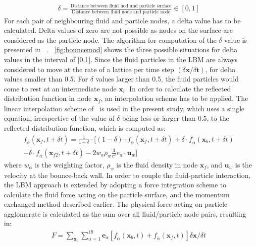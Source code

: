 \begin{align}
\delta = \frac{\mbox{Distance between fluid nod and particle surface}}{\mbox{Distance between fluid node and particle node}} \in [0,1]
\end{align} 
For each pair of neighbouring fluid and particle nodes, a delta value has to be calculated. Delta values of zero are not possible as nodes on the surface are considered as the particle node. The algorithm for computation of the $\delta$ value is presented in ~\citet{Iglberger2008}. ~\cref{fig:bouncemod} shows the three possible situations for delta values in the interval of [0,1]. Since the fluid particles in the LBM are always considered to move at the rate of a lattice per time step $(\delta \mathbf{x}/ \delta \mathbf{t})$, for delta values smaller than 0.5. For $\delta$ values larger than 0.5, the fluid particles would come to rest at an intermediate node $\mathbf{x}_{\mathit{i}}$. In order to calculate the reflected distribution function in node $\mathbf{x}_{\mathit{f}}$, an interpolation scheme has to be applied. The linear interpolation scheme of~\citet{Yu2002, Yu2003} is used in the present study, which uses a single equation, irrespective of the value of $\delta$ being less or larger than 0.5, to the reflected distribution function, which is computed as:
\begin{align}
 \nonumber
\mathit{\mathit{f}}_{\overline{\alpha}}(\mathbf{x}_{\mathit{f}},t + \delta t) = \frac{1}{1 + \delta} \cdot [(1-\delta)\cdot \mathit{\mathit{f}}_{\alpha}(\mathbf{x}_{\mathit{f}},t + \delta t) + \delta \cdot \mathit{\mathit{f}}_{\alpha}(\mathbf{x}_{\mathit{b}},t + \delta t)  \\
+ \delta \cdot \mathit{\mathit{f}}_{\overline{\alpha}}(\mathbf{x}_{\mathit{f2}},t + \delta t) -2\mathit{w}_{\mathit{a}}\rho_{\mathit{w}}\frac{3}{\mathit{c}^{2}}\mathbf{\mathit{e}}_{\mathit{a}}\cdot \mathbf{u}_{\mathit{w}}]
\end{align}
where $\mathit{w}_{\alpha}$ is the weighting factor, $\rho_{\mathit{w}}$ is the fluid density in node $\mathbf{x}_{\mathit{f}}$, and $ \mathbf{u}_{\mathit{w}}  $ is the velocity at the bounce-back wall. In order to couple the fluid-particle interaction, the LBM approach is extended by adopting a force integration scheme to calculate the fluid force acting on the particle surface, and the momentum exchanged method described earlier. The physical force acting on particle agglomerate is calculated as the sum over all fluid/particle node pairs, resulting in: 
\begin{align}
\mathit{F} = \sum\limits_{\mathbf{x}_{b}}\sum\limits_{\alpha=1}^{19}{\mathbf{e}_{\alpha}[\mathit{f}_{\alpha}(\mathbf{x}_{b},t)+\mathit{f}_{\overline{\alpha}}(\mathbf{x}_{f},t)] \delta \mathbf{x} / \delta t}
\end{align}
